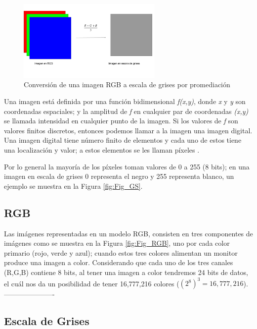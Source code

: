 \begin{onehalfspacing}
\begin{figure}[p]
	\centering
	\includegraphics[width=7cm,keepaspectratio]{XX_Figures/Fig_RGBtoGS.png}
	\caption{\footnotesize Conversión de una imagen RGB a escala de grises por promediación}
	\label{fig:Fig_RGBtoGS}
\end{figure}

Una imagen está definida por una función bidimensional \textit{f(x,y)}, donde \textit{x} y \textit{y} son coordenadas espaciales; y la amplitud de \textit{f}  en cualquier par de coordenadas \textit{(x,y)} se llamada intensidad en cualquier punto de la imagen.
Si los valores de \textit{f} son valores finitos discretos, entonces podemos llamar a la imagen una imagen digital. Una imagen digital tiene número finito de elementos y cada uno de estos tiene una localización y valor; a estos elementos se les llaman píxeles \cite{GonzalezDigitalProcessing.pdf}.

Por lo general la mayoría de los píxeles toman valores de 0 a 255 (8 bits); en una imagen en escala de grises 0 representa el  negro y 255 representa blanco, un ejemplo se muestra en la Figura \ref{fig:Fig_GS}.

\subsection{RGB}
\label{RGB}

Las imágenes representadas en un modelo RGB, consisten en tres componentes de imágenes como se muestra en la Figura \ref{fig:Fig_RGB}, uno por cada color primario (rojo, verde y azul); cuando estos tres colores alimentan un monitor produce una imagen a color. Considerando que cada uno de los tres canales (R,G,B) contiene 8 bits, al tener una imagen a color tendremos 24 bits de datos, el cuál nos da un posibilidad de tener 16,777,216 colores ($(2^8)^3 = 16,777,216$).\\

----------------------
\subsection{Escala de Grises}
\label{GS}


\end{onehalfspacing}
